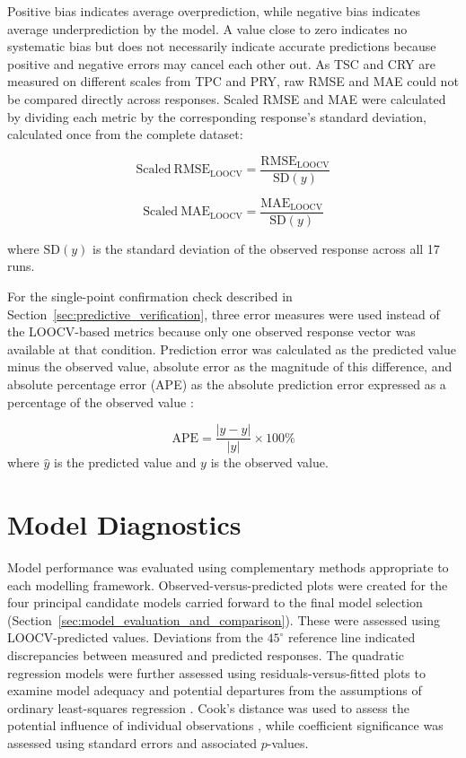 \documentclass[MScDSA]{uccthesis}
\begin{document}
Positive bias indicates average overprediction, while negative bias indicates average underprediction by the model. A value close to zero indicates no systematic bias but does not necessarily indicate accurate predictions because positive and negative errors may cancel each other out.
As TSC and CRY are measured on different scales from TPC and PRY, raw RMSE and MAE could not be compared directly across responses. Scaled RMSE and MAE were calculated by dividing each metric by the corresponding response's standard deviation, calculated once from the complete dataset:

\begin{equation}
   \mathrm{Scaled\ RMSE}_{\mathrm{LOOCV}} = \frac{\mathrm{RMSE}_{\mathrm{LOOCV}}}{\mathrm{SD}(y)}
    \label{eq:scaled_loocv_rmse}
\end{equation}

\begin{equation}
   \mathrm{Scaled\ MAE}_{\mathrm{LOOCV}} = \frac{\mathrm{MAE}_{\mathrm{LOOCV}}}{\mathrm{SD}(y)}
    \label{eq:scaled_loocv_mae}
\end{equation}

where $\mathrm{SD}(y)$ is the standard deviation of the observed response across all 17 runs.

For the single-point confirmation check described in Section~\ref{sec:predictive_verification}, three error measures were used instead of the LOOCV-based metrics because only one observed response vector was available at that condition. Prediction error was calculated as the predicted value minus the observed value, absolute error as the magnitude of this difference, and absolute percentage error (APE) as the absolute prediction error expressed as a percentage of the observed value \parencite{NIST:2012}:

\begin{equation}
   \mathrm{APE} = \frac{\left|\hat{y}-y\right|}{\left|y\right|} \times 100\%
   \label{eq:ape}
\end{equation}   
where $\hat{y}$ is the predicted value and $y$ is the observed value.

\section{Model Diagnostics}
\label{sec:model_diagnostics}
Model performance was evaluated using complementary methods appropriate to each modelling framework. Observed-versus-predicted plots were created for the four principal candidate models carried forward to the final model selection (Section~\ref{sec:model_evaluation_and_comparison}). These were assessed using LOOCV-predicted values. Deviations from the $45^\circ$ reference line indicated discrepancies between measured and predicted responses. The quadratic regression models were further assessed using residuals-versus-fitted plots to examine model adequacy and potential departures from the assumptions of ordinary least-squares regression \parencite{Montgomery:2017}. Cook's distance was used to assess the potential influence of individual observations \parencite{Cook:1977, Cook:1982}, while coefficient significance was assessed using standard errors and associated $p$-values.
\end{document}
